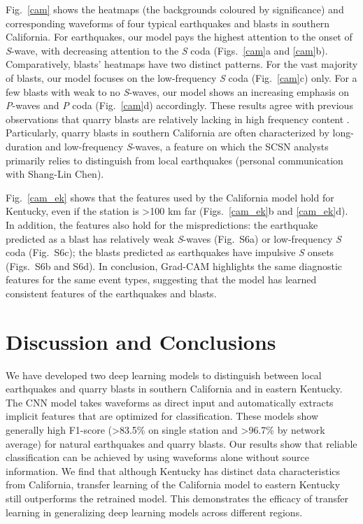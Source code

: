 \documentclass{gji}
\begin{document}
Fig.~\ref{cam} shows the heatmaps (the backgrounds coloured by significance) and corresponding waveforms of four typical earthquakes and blasts in southern California. For earthquakes, our model pays the highest attention to the onset of \textit{S}-wave, with decreasing attention to the \textit{S} coda (Figs.~\ref{cam}a and \ref{cam}b). Comparatively, blasts' heatmaps have two distinct patterns. For the vast majority of blasts, our model focuses on the low-frequency \textit{S} coda (Fig.~\ref{cam}c) only. For a few blasts with weak to no \textit{S}-waves, our model shows an increasing emphasis on \textit{P}-waves and \textit{P} coda (Fig.~\ref{cam}d) accordingly. These results agree with previous observations that quarry blasts are relatively lacking in high frequency content \citep{allmann,korrat,kortstrom,su}. Particularly, quarry blasts in southern California are often characterized by long-duration and low-frequency \textit{S}-waves, a feature on which the SCSN analysts primarily relies to distinguish from local earthquakes (personal communication with Shang-Lin Chen).

Fig.~\ref{cam_ek} shows that the features used by the California model hold for Kentucky, even if the station is \textgreater{100} km far (Figs.~\ref{cam_ek}b and \ref{cam_ek}d). In addition, the features also hold for the mispredictions: the earthquake predicted as a blast has relatively weak \textit{S}-waves (Fig.~S6a) or low-frequency \textit{S} coda (Fig.~S6c); the blasts predicted as earthquakes have impulsive \textit{S} onsets (Figs.~S6b and S6d). In conclusion, Grad-CAM highlights the same diagnostic features for the same event types, suggesting that the model has learned consistent features of the earthquakes and blasts.

\section{Discussion and Conclusions}
We have developed two deep learning models to distinguish between local earthquakes and quarry blasts in southern California and in eastern Kentucky. The CNN model takes waveforms as direct input and automatically extracts implicit features that are optimized for classification. These models show generally high F1-score (\textgreater{83.5\%} on single station and \textgreater{96.7\%} by network average) for natural earthquakes and quarry blasts. Our results show that reliable classification can be achieved by using waveforms alone without source information. We find that although Kentucky has distinct data characteristics from California, transfer learning of the California model to eastern Kentucky still outperforms the retrained model. This demonstrates the efficacy of transfer learning in generalizing deep learning models across different regions.
\end{document}
